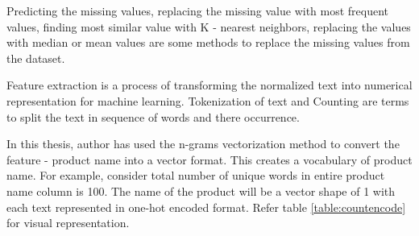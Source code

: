Predicting the missing values, replacing the missing value with most frequent values, finding most similar value with K - nearest neighbors, replacing the values with median or mean values are some methods to replace the missing values from the dataset.


Feature extraction is a process of transforming the normalized text into numerical representation for machine learning.  Tokenization of text and Counting are terms to split the text in sequence of words and there occurrence. 

In this thesis, author has used the n-grams vectorization method to convert the feature - product name into a vector format. This creates a vocabulary of product name. For example, consider total number of unique words in entire product name column is 100. The name of the product will be a vector shape of 1  with each text represented in one-hot encoded format. Refer table \ref{table:countencode} for visual representation.
